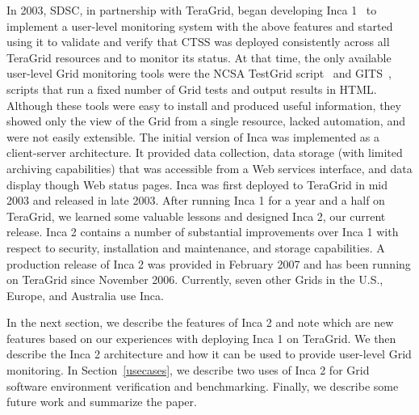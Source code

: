 \documentclass[times, 10pt,twocolumn]{article}
\begin{document}
In 2003, SDSC, in partnership with TeraGrid, began developing Inca
1~\cite{inca1} to implement a user-level monitoring system with the above
features and started using it to validate and
verify that CTSS was deployed consistently across all TeraGrid resources and
to monitor its status.  At that time, the only available user-level Grid
monitoring tools were the NCSA TestGrid script~\cite{ncsa-test} and
GITS~\cite{gits}, scripts that run a fixed number of Grid tests and output
results in HTML.  Although these tools were easy to install and produced
useful information, they showed only the view of the Grid from a single
resource, lacked automation, and were not easily extensible.  The initial
version of Inca was implemented as a client-server architecture.  It provided
data collection, data storage (with limited archiving capabilities) that was
accessible from a Web services interface, and data display though Web status
pages.  Inca was first deployed to TeraGrid in mid 2003 and released in late
2003. After running Inca 1 for a year and a half on TeraGrid, we learned some
valuable lessons and designed Inca 2, our current release.  Inca 2
contains a number of substantial improvements over Inca 1 with respect to
security, installation and maintenance, and storage capabilities.  A
production release of Inca 2 was provided in February 2007 and has been
running on TeraGrid since November 2006.  Currently, seven other Grids in the
U.S., Europe, and Australia use Inca.  

In the next section, we describe the features of Inca 2 and note which
are new features based on our experiences with deploying Inca 1 on TeraGrid.
We then describe the Inca 2 architecture and how it can be used to provide
user-level Grid monitoring.  In Section~\ref{usecases}, we describe two 
uses of Inca 2 for Grid software environment verification and benchmarking.  
Finally, we describe some future work and summarize the paper.

  
\end{document}
